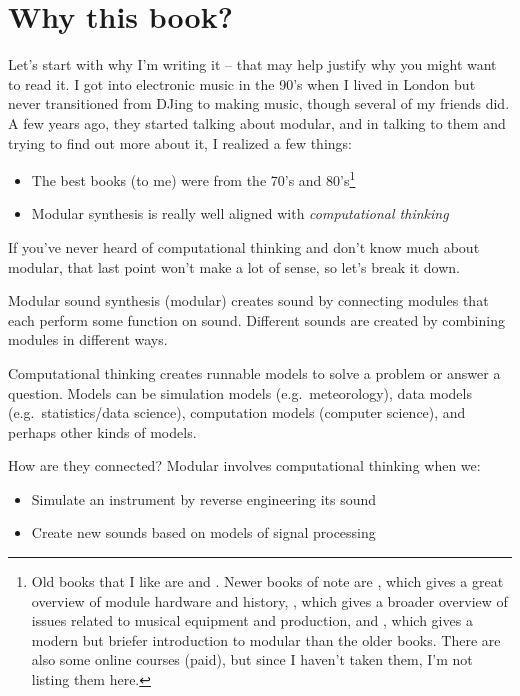 \documentclass[
]{book}
\providecommand{\tightlist}{%
  \setlength{\itemsep}{0pt}\setlength{\parskip}{0pt}}
\begin{document}
\hypertarget{why-this-book}{%
\section{Why this book?}\label{why-this-book}}

Let's start with why I'm writing it -- that may help justify why you might want to read it.
I got into electronic music in the 90's when I lived in London but never transitioned from DJing to making music, though several of my friends did.
A few years ago, they started talking about modular, and in talking to them and trying to find out more about it, I realized a few things:

\begin{itemize}
\tightlist
\item
  The best books (to me) were from the 70's and 80's\footnote{Old books that I like are \citet{Crombie1982} and \citet{Strange1983}. Newer books of note are \citet{Bjoern2018}, which gives a great overview of module hardware and history, \citet{Eliraz2022}, which gives a broader overview of issues related to musical equipment and production, and \citet{Dusha2020}, which gives a modern but briefer introduction to modular than the older books. There are also some online courses (paid), but since I haven't taken them, I'm not listing them here.}
\item
  Modular synthesis is really well aligned with \emph{computational thinking}
\end{itemize}

If you've never heard of computational thinking and don't know much about modular, that last point won't make a lot of sense, so let's break it down.

Modular sound synthesis (modular) creates sound by connecting modules that each perform some function on sound.
Different sounds are created by combining modules in different ways.

Computational thinking creates runnable models to solve a problem or answer a question.
Models can be simulation models (e.g.~meteorology), data models (e.g.~statistics/data science), computation models (computer science), and perhaps other kinds of models.

How are they connected? Modular involves computational thinking when we:

\begin{itemize}
\tightlist
\item
  Simulate an instrument by reverse engineering its sound
\item
  Create new sounds based on models of signal processing
\end{itemize}
\end{document}
